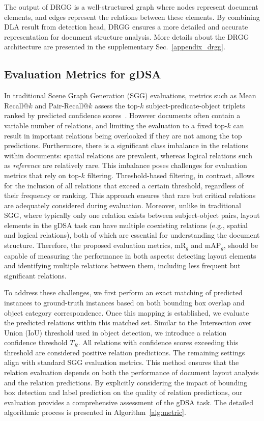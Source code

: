 The output of DRGG is a well-structured graph where nodes represent document elements, and edges represent the relations between these elements. By combining {DLA result from detection head}, DRGG ensures a more detailed and accurate representation for document structure analysis. {More details about the DRGG architecture are presented in the supplementary Sec.~\ref{appendix_drgg}.} 

\subsection{Evaluation Metrics for gDSA}
\label{gdsa_eval}
In traditional Scene Graph Generation (SGG) evaluations, metrics such as Mean Recall@$k$ and Pair-Recall@$k$ assess the top-$k$ subject-predicate-object triplets ranked by predicted confidence scores~\citep{lorenz2024sgbench}. However documents often contain a variable number of relations, and limiting the evaluation to a fixed top-$k$ can result in important relations being overlooked if they are not among the top predictions. Furthermore, there is a significant class imbalance in the relations within documents: spatial relations are prevalent, whereas logical relations such as \textit{reference} are relatively rare. This imbalance poses challenges for evaluation metrics that rely on top-$k$ filtering. 
Threshold-based filtering, in contrast, allows for the inclusion of all relations that exceed a certain threshold, regardless of their frequency or ranking. This approach ensures that rare but critical relations are adequately considered during evaluation. Moreover, unlike in traditional SGG, where typically only one relation exists between subject-object pairs, layout elements in the gDSA task can have multiple coexisting relations (e.g., spatial and logical relations), both of which are essential for understanding the document structure. Therefore, the proposed evaluation metrics, $\text{mR}_g$ %
and $\text{mAP}_g$, should be capable of measuring the performance in both aspects: detecting layout elements and identifying multiple relations between them, including less frequent but significant relations.

To address these challenges, we first perform an exact matching of predicted instances to ground-truth instances based on both bounding box overlap and object category correspondence. Once this mapping is established, we evaluate the predicted relations within this matched set. Similar to the Intersection over Union (IoU) threshold used in object detection, we introduce a relation confidence threshold $T_{R}$. All relations with confidence scores exceeding this threshold are considered positive relation predictions. The remaining settings align with standard SGG evaluation metrics. This method ensures that the relation evaluation depends on both the performance of document layout analysis and the relation predictions. By explicitly considering the impact of bounding box detection and label prediction on the quality of relation predictions, our evaluation provides a comprehensive assessment of the gDSA task. The detailed algorithmic process is presented in Algorithm~\ref{alg:metric}.








